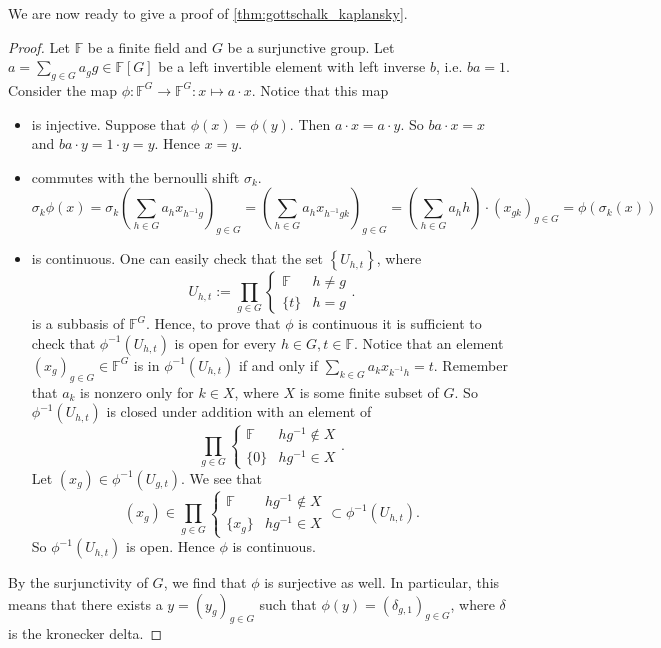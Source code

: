 \documentclass[titlepage, a4paper]{article}
\newcommand{\F}{\mathbb{F}}
\theoremstyle{theoremdd}
\theoremstyle{definitiondd}
\theoremstyle{remarkdd}
\begin{document}
	We are now ready to give a proof of \cref{thm:gottschalk_kaplansky}.
	\begin{proof}
		Let $\F$ be a finite field and $G$ be a surjunctive group. 
		Let $a = \sum_{g \in G} a_g g \in \F[G]$ be a left invertible element with left inverse $b$, i.e.  $b a = 1$. 
		Consider the map $\phi: \F^{G} \to \F^{G}: x \mapsto a\cdot x$. Notice that this map 
		\begin{itemize}
			\item is injective. Suppose that $\phi(x) = \phi(y)$. Then $a\cdot x = a\cdot y$. So $ba\cdot x  = x$ and $ba \cdot y = 1\cdot y = y$. Hence $x = y$.
			\item commutes with the bernoulli shift  $\sigma_k$. 
				 \[
					 \sigma_k \phi(x) 
					 = \sigma_k\left( \sum_{h \in G} a_h x_{h^{-1}g} \right)_{g \in G} 
					 = \left( \sum_{h \in G} a_h x_{h^{-1}gk} \right)_{g \in G} 
					 = \left( \sum_{h \in G}a_h h \right) \cdot (x_{gk})_{g \in G} = \phi(\sigma_k(x)) 
				\]
			\item is continuous. 
			One can easily check that the set $\left\{ U_{h, t} \right\}$, where \[
			U_{h,t}:= \prod_{g \in G} \begin{cases}
				\F & h \ne g\\
				\{t\}& h = g
			\end{cases}
			.\] 
			is a subbasis of $\F^{G}$. 
			Hence, to prove that $\phi$ is continuous it is sufficient to check that $\phi^{-1}(U_{h, t})$ is open for every $h \in G, t\in \F$.
			Notice that an element $(x_g)_{g \in G} \in \F^{G}$ is in $\phi^{-1}(U_{h,t})$ if and only if $\sum_{k \in G} a_k x_{k^{-1}h} = t$. 
			Remember that $a_k$ is nonzero only for $k \in X$, where $X$ is some finite subset of $G$. 	
			So $\phi^{-1}(U_{h, t})$ is closed under addition with an element of  \[
			\prod_{g \in G} \begin{cases}
				\F & hg^{-1}  \not\in X\\
				\{0\} & hg^{-1} \in X 
			\end{cases}
			.\] 
			Let  $(x_g) \in \phi^{-1}(U_{g,t})$. We see that  \[
				(x_g) \in \prod_{g \in G} \begin{cases}
					\F & hg^{-1} \not\in X\\
					\{x_g\} & hg^{-1} \in X
				\end{cases}
				\subset \phi^{-1}(U_{h, t})
			.\] 
			So $\phi^{-1}(U_{h,t})$ is open. Hence $\phi$ is continuous.			
		\end{itemize}
		By the surjunctivity of $G$, we find that $\phi$ is surjective as well. In particular, this means that there exists a $y = (y_g)_{g \in G}$ such that $\phi(y) = (\delta_{g, 1})_{g \in G}$, where $\delta$ is the kronecker delta.

\end{proof}
\end{document}
